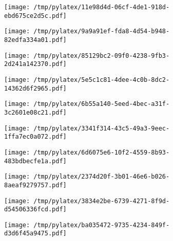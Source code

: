 \documentclass{article}
\begin{document}
\begin{figure}[htbp]
\begin{subfigure}[b]{.3\linewidth}
\texttt{[image: /tmp/pylatex/11e98d4d-06cf-4de1-918d-ebd675ce2d5c.pdf]}
\end{subfigure}
\begin{subfigure}[b]{.3\linewidth}
\texttt{[image: /tmp/pylatex/9a9a91ef-fda8-4d54-b948-82edfa334a01.pdf]}
\end{subfigure}
\begin{subfigure}[b]{.3\linewidth}
\texttt{[image: /tmp/pylatex/85129bc2-09f0-4238-9fb3-2d241a142370.pdf]}
\end{subfigure}
\begin{subfigure}[b]{.3\linewidth}
\texttt{[image: /tmp/pylatex/5e5c1c81-4dee-4c0b-8dc2-14362d6f2965.pdf]}
\end{subfigure}
\begin{subfigure}[b]{.3\linewidth}
\texttt{[image: /tmp/pylatex/6b55a140-5eed-4bec-a31f-3c2601e08c21.pdf]}
\end{subfigure}
\begin{subfigure}[b]{.3\linewidth}
\texttt{[image: /tmp/pylatex/3341f314-43c5-49a3-9eec-1ffa7ec0a072.pdf]}
\end{subfigure}
\begin{subfigure}[b]{.3\linewidth}
\texttt{[image: /tmp/pylatex/6d6075e6-10f2-4559-8b93-483bdbecfe1a.pdf]}
\end{subfigure}
\begin{subfigure}[b]{.3\linewidth}
\texttt{[image: /tmp/pylatex/2374d20f-3b01-46e6-b026-8aeaf9279757.pdf]}
\end{subfigure}
\begin{subfigure}[b]{.3\linewidth}
\texttt{[image: /tmp/pylatex/3834e2be-6739-4271-8f9d-d54506336fcd.pdf]}
\end{subfigure}
\begin{subfigure}[b]{.3\linewidth}
\texttt{[image: /tmp/pylatex/ba035472-9735-4234-849f-d3d6f45a9475.pdf]}
\end{subfigure}
\end{figure}
\end{document}
